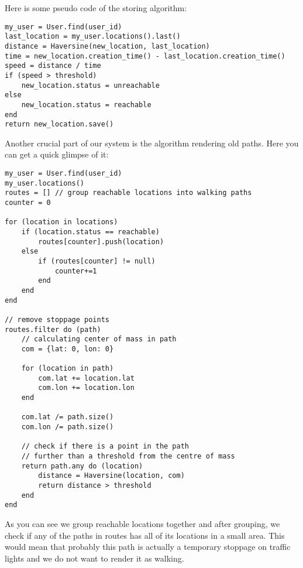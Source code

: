 Here is some pseudo code of the storing algorithm:
\begin{lstlisting}
my_user = User.find(user_id)
last_location = my_user.locations().last()
distance = Haversine(new_location, last_location)
time = new_location.creation_time() - last_location.creation_time()
speed = distance / time
if (speed > threshold)
    new_location.status = unreachable
else
    new_location.status = reachable
end
return new_location.save()
\end{lstlisting}
Another crucial part of our system is the algorithm rendering old paths. Here you can get a quick glimpse of it:
\begin{lstlisting}
my_user = User.find(user_id)
my_user.locations()
routes = [] // group reachable locations into walking paths
counter = 0

for (location in locations)
    if (location.status == reachable)
        routes[counter].push(location)
    else
        if (routes[counter] != null)
            counter+=1
        end
    end
end

// remove stoppage points
routes.filter do (path)
    // calculating center of mass in path
    com = {lat: 0, lon: 0}

    for (location in path)
        com.lat += location.lat
        com.lon += location.lon
    end

    com.lat /= path.size()
    com.lon /= path.size()

    // check if there is a point in the path
    // further than a threshold from the centre of mass
    return path.any do (location)
        distance = Haversine(location, com)
        return distance > threshold
    end
end
\end{lstlisting}
As you can see we group reachable locations together and after grouping, we check if any of the paths in routes has all of its locations in a small area. This would mean that probably this path is actually a temporary stoppage on traffic lights and we do not want to render it as walking.
